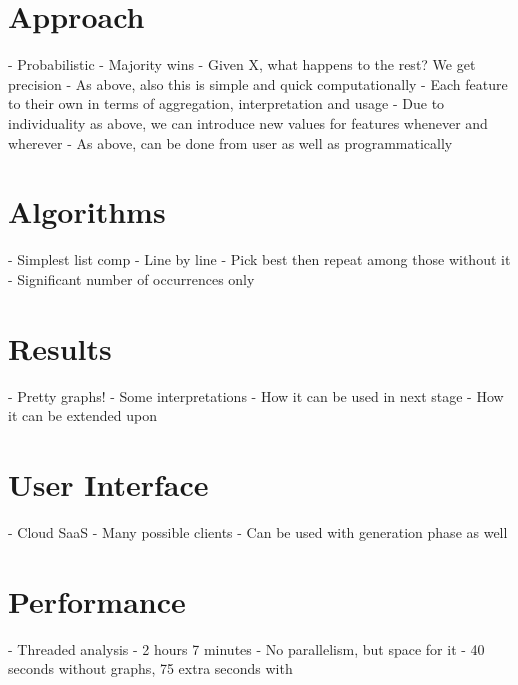 \section{Approach}
- Probabilistic
- Majority wins
- Given X, what happens to the rest? We get precision
- As above, also this is simple and quick computationally
- Each feature to their own in terms of aggregation, interpretation and usage
- Due to individuality as above, we can introduce new values for features whenever and wherever
- As above, can be done from user as well as programmatically

\section{Algorithms}
- Simplest list comp
- Line by line
- Pick best then repeat among those without it
- Significant number of occurrences only

\section{Results}
- Pretty graphs!
- Some interpretations
- How it can be used in next stage
- How it can be extended upon

\section{User Interface}
- Cloud SaaS
- Many possible clients
- Can be used with generation phase as well

\section{Performance}
- Threaded analysis
- 2 hours 7 minutes
- No parallelism, but space for it
- 40 seconds without graphs, 75 extra seconds with




